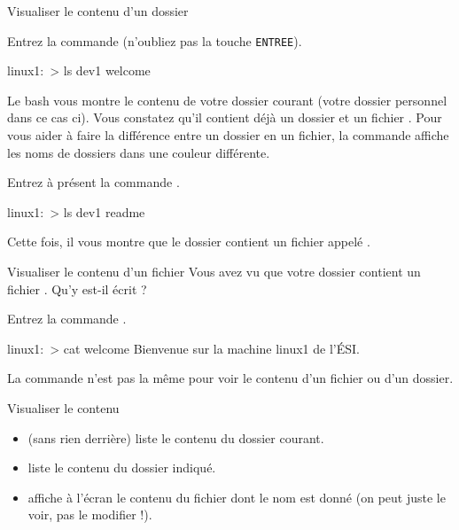 \documentclass[a4paper,11pt]{style-esi/td}
\begin{document}
		\begin{Experience}{Visualiser le contenu d'un dossier}
			\vspace{-1em}
			\begin{steps}
			\item 
				Entrez la commande  (n'oubliez pas la touche \verb|ENTREE|).				
				\begin{Console}
					linux1:~> ls
					dev1 welcome
				\end{Console}				
				Le bash vous montre le contenu de votre dossier courant
				(votre dossier personnel dans ce cas ci).
				Vous constatez qu'il contient déjà un dossier 
				et un fichier .
				Pour vous aider à faire la différence
				entre un dossier en un fichier, 
				la commande 
				affiche les noms de dossiers dans une couleur différente.
			\item 
				Entrez à présent la commande .
				\begin{Console}
					linux1:~> ls dev1
					readme
				\end{Console}				
				Cette fois, il vous montre que le dossier  contient
				un fichier appelé .
			\end{steps}			
		\end{Experience}

		\begin{Experience}{Visualiser le contenu d'un fichier}
			Vous avez vu que votre dossier contient un fichier \samp{welcome}.
			Qu'y est-il écrit ?
			\begin{steps}
			\item 
				Entrez la commande \kbd{cat welcome}.
				\begin{Console}
					linux1:~> cat welcome
					Bienvenue sur la machine linux1 de l'ÉSI.
				\end{Console}
				La commande n'est pas la même pour voir le contenu d'un fichier
				ou d'un dossier.
			\end{steps}			
		\end{Experience}

		\bigskip
		\begin{theorie}{Visualiser le contenu}
			\begin{itemize}
			\item {}
				(sans rien derrière) liste le contenu du dossier courant.
			\item {}
				liste le contenu du dossier indiqué.
			\item {}
				affiche à l'écran le contenu du fichier dont le nom est donné 
				(on peut juste le voir, pas le modifier !).
			\end{itemize}
		\end{theorie}
	
\end{document}
